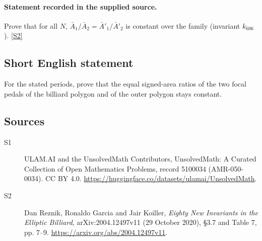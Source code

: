 \documentclass[11pt]{article}
\newcommand{\sref}[2]{\hyperlink{source:#1:#2}{[S#2]}}
\begin{document}
\paragraph{Statement recorded in the supplied source.}
Prove that for all $N$, $\bar A_1/\bar A_2=\bar A'_1/\bar A'_2$ is constant over the family (invariant $k_{606}$). \sref{5100034}{2}
\subsection{Short English statement}
For the stated periods, prove that the equal signed-area ratios of the two focal pedals of the billiard polygon and of the outer polygon stays constant.
\subsection{Sources}
\begin{description}
\item[\hypertarget{source:5100034:1}{S1}] ULAM.AI and the UnsolvedMath Contributors, UnsolvedMath: A Curated Collection of Open Mathematics Problems, record 5100034 (AMR-050-0034). CC BY 4.0. \url{https://huggingface.co/datasets/ulamai/UnsolvedMath}.
\item[\hypertarget{source:5100034:2}{S2}] Dan Reznik, Ronaldo Garcia and Jair Koiller, \emph{Eighty New Invariants in the Elliptic Billiard}, arXiv:2004.12497v11 (29 October 2020), \S3.7 and Table 7, pp. 7--9. \url{https://arxiv.org/abs/2004.12497v11}.
\end{description}
\label{end:5100034}
\end{document}
